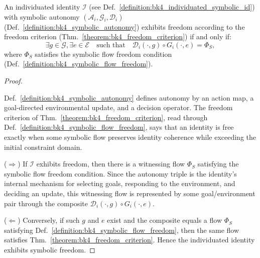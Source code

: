 \begin{lemma}
\label{lemma:bk4_autonomy_freedom_relation}
An individuated identity $\mathcal{I}$ (see Def.~\ref{definition:bk4_individuated_symbolic_id}) with symbolic autonomy $(\mathcal{A}_i, \mathcal{G}_i, \mathcal{D}_i)$ (Def.~\ref{definition:bk4_symbolic_autonomy}) exhibits freedom according to the freedom criterion (Thm.~\ref{theorem:bk4_freedom_criterion}) if and only if:
\[
\exists g \in \mathcal{G}, \exists e \in \mathcal{E} \quad \text{such that} \quad \mathcal{D}_i(\cdot, g) \circ G_i(\cdot, e) = \Phi_S,
\]
where $\Phi_S$ satisfies the symbolic flow freedom condition (Def.~\ref{definition:bk4_symbolic_flow_freedom}).
\end{lemma}

\begin{proof}
\label{proof:bk4_autonomy_freedom_relation}
\leavevmode

Def.~\ref{definition:bk4_symbolic_autonomy} defines autonomy by an action map,
a goal-directed environmental update, and a decision operator. The freedom
criterion of Thm.~\ref{theorem:bk4_freedom_criterion}, read through
Def.~\ref{definition:bk4_symbolic_flow_freedom}, says that an identity is free
exactly when some symbolic flow preserves identity coherence while exceeding
the initial constraint domain.

($\Rightarrow$) If $\mathcal I$ exhibits freedom, then there is a witnessing
flow $\Phi_S$ satisfying the symbolic flow freedom condition. Since the autonomy
triple is the identity's internal mechanism for selecting goals, responding to
the environment, and deciding an update, this witnessing flow is represented by
some goal/environment pair through the composite
$\mathcal D_i(\cdot,g)\circ G_i(\cdot,e)$.

($\Leftarrow$) Conversely, if such $g$ and $e$ exist and the composite equals a
flow $\Phi_S$ satisfying Def.~\ref{definition:bk4_symbolic_flow_freedom}, then
the same flow satisfies Thm.~\ref{theorem:bk4_freedom_criterion}. Hence the
individuated identity exhibits symbolic freedom.
\end{proof}

